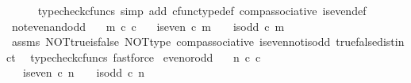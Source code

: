 \begin{isabellebody}
\ \ \ \ \isamarkupfalse%
\ {\isacharparenleft}{\kern0pt}typecheck{\isacharunderscore}{\kern0pt}cfuncs{\isacharcomma}{\kern0pt}\ simp\ add{\isacharcolon}{\kern0pt}\ cfunc{\isacharunderscore}{\kern0pt}type{\isacharunderscore}{\kern0pt}def\ comp{\isacharunderscore}{\kern0pt}associative\ is{\isacharunderscore}{\kern0pt}even{\isacharunderscore}{\kern0pt}def{}{\isacharparenright}{\kern0pt}\isanewline
{}\isamarkupfalse%
%
\endisatagproof
{\isafoldproof}%
%
\isadelimproof
\isanewline
%
\endisadelimproof
\isanewline
{}\isamarkupfalse%
\ not{\isacharunderscore}{\kern0pt}even{\isacharunderscore}{\kern0pt}and{\isacharunderscore}{\kern0pt}odd{\isacharcolon}{\kern0pt}\isanewline
\ \ \ {\isachardoublequoteopen}m\ {\isasymin}\isactrlsub c\ {\isasymnat}\isactrlsub c{\isachardoublequoteclose}\isanewline
\ \ \ {\isachardoublequoteopen}{\isasymnot}{\isacharparenleft}{\kern0pt}is{\isacharunderscore}{\kern0pt}even\ {\isasymcirc}\isactrlsub c\ m\ {\isacharequal}{\kern0pt}\ {\isasymt}\ {\isasymand}\ is{\isacharunderscore}{\kern0pt}odd\ {\isasymcirc}\isactrlsub c\ m\ {\isacharequal}{\kern0pt}\ {\isasymt}{\isacharparenright}{\kern0pt}{\isachardoublequoteclose}\isanewline
%
\isadelimproof
\ \ %
\endisadelimproof
%
\isatagproof
{}\isamarkupfalse%
\ assms\ NOT{\isacharunderscore}{\kern0pt}true{\isacharunderscore}{\kern0pt}is{\isacharunderscore}{\kern0pt}false\ NOT{\isacharunderscore}{\kern0pt}type\ comp{\isacharunderscore}{\kern0pt}associative{}\ is{\isacharunderscore}{\kern0pt}even{\isacharunderscore}{\kern0pt}not{\isacharunderscore}{\kern0pt}is{\isacharunderscore}{\kern0pt}odd\ true{\isacharunderscore}{\kern0pt}false{\isacharunderscore}{\kern0pt}distinct\ \isamarkupfalse%
\ {\isacharparenleft}{\kern0pt}typecheck{\isacharunderscore}{\kern0pt}cfuncs{\isacharcomma}{\kern0pt}\ fastforce{\isacharparenright}{\kern0pt}%
\endisatagproof
{\isafoldproof}%
%
\isadelimproof
\isanewline
%
\endisadelimproof
\isanewline
{}\isamarkupfalse%
\ even{\isacharunderscore}{\kern0pt}or{\isacharunderscore}{\kern0pt}odd{\isacharcolon}{\kern0pt}\isanewline
\ \ \ {\isachardoublequoteopen}n\ {\isasymin}\isactrlsub c\ {\isasymnat}\isactrlsub c{\isachardoublequoteclose}\isanewline
\ \ \ {\isachardoublequoteopen}is{\isacharunderscore}{\kern0pt}even\ {\isasymcirc}\isactrlsub c\ n\ {\isacharequal}{\kern0pt}\ {\isasymt}\ {\isasymor}\ is{\isacharunderscore}{\kern0pt}odd\ {\isasymcirc}\isactrlsub c\ n\ {\isacharequal}{\kern0pt}\ {\isasymt}{\isachardoublequoteclose}\isanewline

\end{isabellebody}

